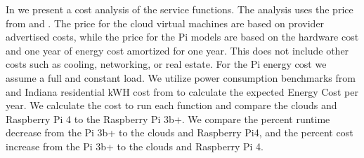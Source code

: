 In  we present a cost analysis of the service functions. The analysis uses the price from  and . The price for the cloud virtual machines are based on provider advertised costs, while the price for the Pi models are based on the hardware cost and one year of energy cost amortized for one year. This does not include other costs such as cooling, networking, or real estate. For the Pi energy cost we assume a full and constant load. We utilize power consumption benchmarks from \cite{pi-power} and Indiana residential kWH cost from \cite{indiana-energy} to calculate the expected Energy Cost per year. We calculate the cost to run each function and compare the clouds and Raspberry Pi 4 to the Raspberry Pi 3b+. We compare the percent runtime decrease from the Pi 3b+ to the clouds and Raspberry Pi4, and the percent cost increase from the Pi 3b+ to the clouds and Raspberry Pi 4.

